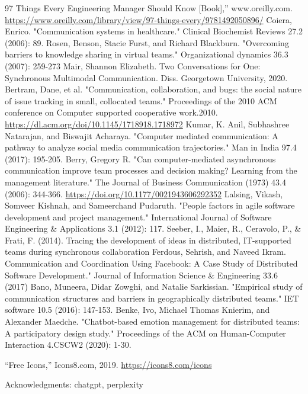 \documentclass{llncs}
\begin{document}
    \begin{thebibliography}{8}
    97 Things Every Engineering Manager Should Know [Book],” www.oreilly.com.
    \url{https://www.oreilly.com/library/view/97-things-every/9781492050896/}
    ‌
    Coiera, Enrico. "Communication systems in healthcare." Clinical Biochemist Reviews 27.2 (2006): 89.
    Rosen, Benson, Stacie Furst, and Richard Blackburn. "Overcoming barriers to knowledge sharing in virtual teams." Organizational dynamics 36.3 (2007): 259-273
    Mair, Shannon Elizabeth. Two Conversations for One: Synchronous Multimodal Communication. Diss. Georgetown University, 2020.
    Bertram, Dane, et al. "Communication, collaboration, and bugs: the social nature of issue tracking in small, collocated teams." Proceedings of the 2010 ACM conference on Computer supported cooperative work.2010. \url{https://dl.acm.org/doi/10.1145/1718918.1718972}
    Kumar, K. Anil, Subhashree Natarajan, and Biswajit Acharaya. "Computer mediated communication: A pathway to analyze social media communication trajectories." Man in India 97.4 (2017): 195-205.
    Berry, Gregory R. "Can computer-mediated asynchronous communication improve team processes and decision making? Learning from the management literature." The Journal of Business Communication (1973) 43.4 (2006): 344-366. \url{https://doi.org/10.1177/0021943606292352}
    Lalsing, Vikash, Somveer Kishnah, and Sameerchand Pudaruth. "People factors in agile software development and project management." International Journal of Software Engineering \& Applications 3.1 (2012): 117.
    Seeber, I., Maier, R., Ceravolo, P., \& Frati, F. (2014). Tracing the development of ideas in distributed, IT-supported teams during synchronous collaboration
    Ferdous, Sehrish, and Naveed Ikram. Communication and Coordination Using Facebook: A Case Study of Distributed Software Development." Journal of Information Science \& Engineering 33.6 (2017)
    Bano, Muneera, Didar Zowghi, and Natalie Sarkissian. "Empirical study of communication structures and barriers in geographically distributed teams." IET software 10.5 (2016): 147-153.
    Benke, Ivo, Michael Thomas Knierim, and Alexander Maedche. "Chatbot-based emotion management for distributed teams: A participatory design study." Proceedings of the ACM on Human-Computer Interaction 4.CSCW2 (2020): 1-30.

    “Free Icons,” Icons8.com, 2019. \url{https://icons8.com/icons}

    Acknowledgments: chatgpt, perplexity
    \end{thebibliography}
    
\end{document}
